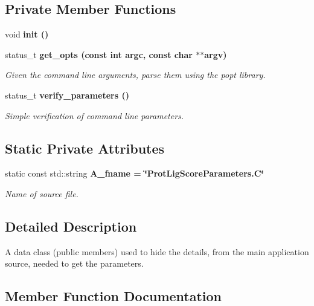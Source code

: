 \subsection*{Private Member Functions}
\begin{CompactItemize}
\item 
void \bf{init} ()
\item 
status\_\-t \bf{get\_\-opts} (const int argc, const char $\ast$$\ast$argv)
\begin{CompactList}\small\item\em Given the command line arguments, parse them using the popt library. \item\end{CompactList}\item 
status\_\-t \bf{verify\_\-parameters} ()
\begin{CompactList}\small\item\em Simple verification of command line parameters. \item\end{CompactList}\end{CompactItemize}
\subsection*{Static Private Attributes}
\begin{CompactItemize}
\item 
static const std::string \bf{A\_\-fname} = \char`\"{}Prot\-Lig\-Score\-Parameters.C\char`\"{}\label{classSimSite3D_1_1ProtLigScoreParameters_fa12c92a4a3e4952fd98edace796988a}

\begin{CompactList}\small\item\em Name of source file. \item\end{CompactList}\end{CompactItemize}


\subsection{Detailed Description}
A data class (public members) used to hide the details, from the main application source, needed to get the parameters. 



\subsection{Member Function Documentation}
